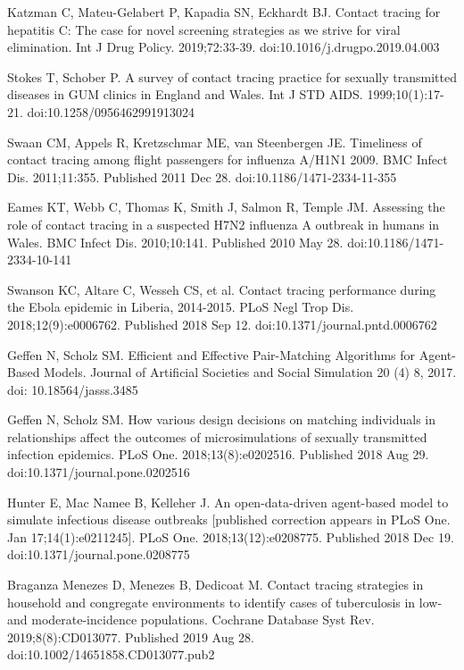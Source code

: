 \documentclass{article}
\begin{document}
\begin{thebibliography}{1}
  Katzman C, Mateu-Gelabert P, Kapadia SN, Eckhardt BJ.
  \newblock Contact tracing for hepatitis C: The case for novel screening
  strategies as we strive for viral elimination.
  \newblock Int J Drug Policy. 2019;72:33-39.
  \newblock doi:10.1016/j.drugpo.2019.04.003

  Stokes T, Schober P.
  \newblock A survey of contact tracing practice for sexually transmitted
  diseases in GUM clinics in England and Wales.
  \newblock Int J STD AIDS. 1999;10(1):17-21.
  \newblock doi:10.1258/0956462991913024

    Swaan CM, Appels R, Kretzschmar ME, van Steenbergen JE.
    \newblock Timeliness of contact tracing among flight passengers for
    influenza A/H1N1 2009.
    \newblock BMC Infect Dis. 2011;11:355. Published 2011 Dec 28.
    \newblock doi:10.1186/1471-2334-11-355

  Eames KT, Webb C, Thomas K, Smith J, Salmon R, Temple JM.
  \newblock Assessing the role of contact tracing in a suspected H7N2 influenza
  A outbreak in humans in Wales.
  \newblock BMC Infect Dis. 2010;10:141. Published 2010 May 28.
  \newblock doi:10.1186/1471-2334-10-141


  Swanson KC, Altare C, Wesseh CS, et al.
  \newblock Contact tracing performance during the Ebola epidemic in Liberia,
  2014-2015.
  \newblock PLoS Negl Trop Dis. 2018;12(9):e0006762. Published 2018 Sep 12.
  \newblock doi:10.1371/journal.pntd.0006762


  Geffen N, Scholz SM.
  \newblock Efficient and Effective Pair-Matching Algorithms for Agent-Based
  Models.
  \newblock Journal of Artificial Societies and Social Simulation 20 (4) 8,
  2017.
  \newblock doi: 10.18564/jasss.3485


  Geffen N, Scholz SM.
  \newblock How various design decisions on matching individuals in
  relationships affect the outcomes of microsimulations of sexually transmitted
  infection epidemics.
  \newblock PLoS One. 2018;13(8):e0202516. Published 2018 Aug 29.
  \newblock doi:10.1371/journal.pone.0202516

  Hunter E, Mac Namee B, Kelleher J.
  \newblock An open-data-driven agent-based model to simulate infectious disease
  outbreaks [published correction appears in PLoS One.
     Jan 17;14(1):e0211245]. PLoS
  One. 2018;13(12):e0208775. Published 2018 Dec 19.
  \newblock doi:10.1371/journal.pone.0208775

  Braganza Menezes D, Menezes B, Dedicoat M.
  \newblock Contact tracing strategies in household and congregate environments
  to identify cases of tuberculosis in low- and moderate-incidence populations.
  \newblock Cochrane Database Syst Rev. 2019;8(8):CD013077. Published 2019 Aug 28.
  \newblock doi:10.1002/14651858.CD013077.pub2

\end{thebibliography}
\end{document}
